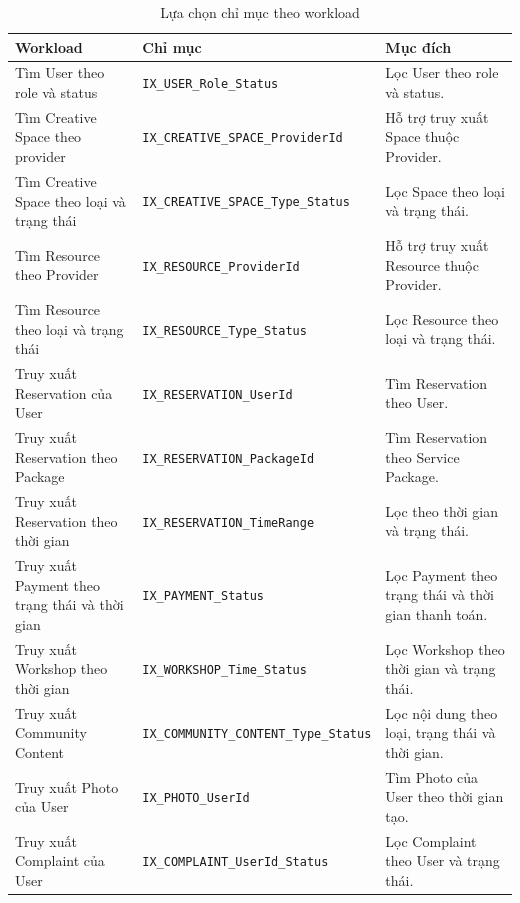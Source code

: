 \begin{table}[htbp]
	\centering
	\label{tab:index_workload}
	\renewcommand{\arraystretch}{1.2}
	\scriptsize
	\begin{tabularx}{\linewidth}{|X|p{5.8cm}|X|}
		\hline
		\textbf{Workload} &
		\textbf{Chỉ mục} &
		\textbf{Mục đích} \\
		\hline
		
		Tìm User theo role và status &
		\texttt{IX\_USER\_Role\_Status} &
		Lọc User theo role và status. \\
		\hline
		
		Tìm Creative Space theo provider &
		\texttt{IX\_CREATIVE\_SPACE\_ProviderId} &
		Hỗ trợ truy xuất Space thuộc Provider. \\
		\hline
		
		Tìm Creative Space theo loại và trạng thái &
		\texttt{IX\_CREATIVE\_SPACE\_Type\_Status} &
		Lọc Space theo loại và trạng thái. \\
		\hline
		
		Tìm Resource theo Provider &
		\texttt{IX\_RESOURCE\_ProviderId} &
		Hỗ trợ truy xuất Resource thuộc Provider. \\
		\hline
		
		Tìm Resource theo loại và trạng thái &
		\texttt{IX\_RESOURCE\_Type\_Status} &
		Lọc Resource theo loại và trạng thái. \\
		\hline
		
		Truy xuất Reservation của User &
		\texttt{IX\_RESERVATION\_UserId} &
		Tìm Reservation theo User. \\
		\hline
		
		Truy xuất Reservation theo Package &
		\texttt{IX\_RESERVATION\_PackageId} &
		Tìm Reservation theo Service Package. \\
		\hline
		
		Truy xuất Reservation theo thời gian &
		\texttt{IX\_RESERVATION\_TimeRange} &
		Lọc theo thời gian và trạng thái. \\
		\hline
		
		Truy xuất Payment theo trạng thái và thời gian &
		\texttt{IX\_PAYMENT\_Status} &
		Lọc Payment theo trạng thái và thời gian thanh toán. \\
		\hline
		
		Truy xuất Workshop theo thời gian &
		\texttt{IX\_WORKSHOP\_Time\_Status} &
		Lọc Workshop theo thời gian và trạng thái. \\
		\hline
		
		Truy xuất Community Content &
		\texttt{IX\_COMMUNITY\_CONTENT\_Type\_Status} &
		Lọc nội dung theo loại, trạng thái và thời gian. \\
		\hline
		
		Truy xuất Photo của User &
		\texttt{IX\_PHOTO\_UserId} &
		Tìm Photo của User theo thời gian tạo. \\
		\hline
		
		Truy xuất Complaint của User &
		\texttt{IX\_COMPLAINT\_UserId\_Status} &
		Lọc Complaint theo User và trạng thái. \\
		\hline
	\end{tabularx}
	\caption{Lựa chọn chỉ mục theo workload}
\end{table}

